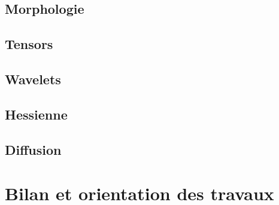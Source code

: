 \subsection{Morphologie}
\label{sec:EA:rehaussement:morpho}

\subsection{Tensors}
\label{sec:EA:rehaussement:tensors}

\subsection{Wavelets}
\label{sec:EA:rehaussement:wavelets}

\subsection{Hessienne}
\label{sec:EA:rehaussement:hessienne}

\subsection{Diffusion}
\label{sec:EA:rehaussement:diffusion}


\section{Bilan et orientation des travaux}
\label{sec:EA:bilan}



